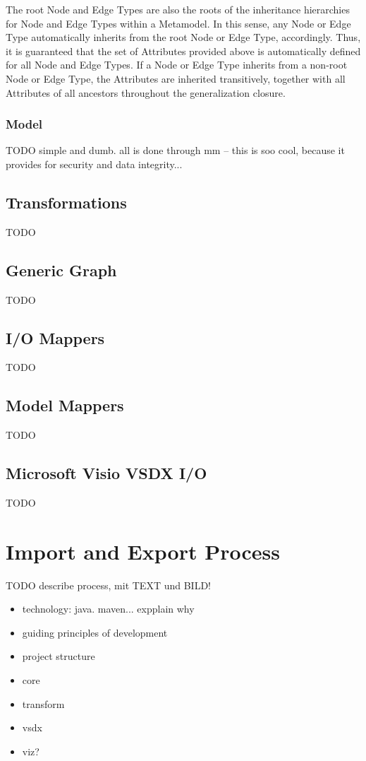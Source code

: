 The root Node and Edge Types are also the roots of the inheritance hierarchies for Node and Edge Types within a Metamodel. In this sense, any Node or Edge Type automatically inherits from the root Node or Edge Type, accordingly. Thus, it is guaranteed that the set of Attributes provided above is automatically defined for all Node and Edge Types. If a Node or Edge Type inherits from a non-root Node or Edge Type, the Attributes are inherited transitively, together with all Attributes of all ancestors throughout the generalization closure.

\subsubsection{Model}

TODO simple and dumb. all is done through mm -- this is soo cool, because it provides for security and data integrity...

\subsection{Transformations}

TODO

\subsection{Generic Graph}

TODO

\subsection{I/O Mappers}

TODO

\subsection{Model Mappers}

TODO

\subsection{Microsoft Visio VSDX I/O}

TODO

\section{Import and Export Process}
\label{sec:impl:process}

TODO describe process, mit TEXT und BILD! 

\begin{itemize}
\item technology: java. maven... expplain why
\item guiding principles of development
\item project structure
\item core
\item transform
\item vsdx
\item viz?
\end{itemize}